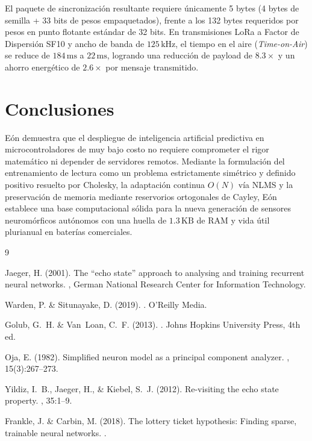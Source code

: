 \documentclass[10pt,twocolumn]{article}
\begin{document}
El paquete de sincronización resultante requiere únicamente 5 bytes (4 bytes de semilla + 33 bits de pesos empaquetados), frente a los 132 bytes requeridos por pesos en punto flotante estándar de 32 bits. En transmisiones LoRa a Factor de Dispersión SF10 y ancho de banda de $125\,\text{kHz}$, el tiempo en el aire (\textit{Time-on-Air}) se reduce de $184\,\text{ms}$ a $22\,\text{ms}$, logrando una reducción de payload de $8.3\times$ y un ahorro energético de $2.6\times$ por mensaje transmitido.

\section{Conclusiones}

Eón demuestra que el despliegue de inteligencia artificial predictiva en microcontroladores de muy bajo costo no requiere comprometer el rigor matemático ni depender de servidores remotos. Mediante la formulación del entrenamiento de lectura como un problema estrictamente simétrico y definido positivo resuelto por Cholesky, la adaptación continua $O(N)$ vía NLMS y la preservación de memoria mediante reservorios ortogonales de Cayley, Eón establece una base computacional sólida para la nueva generación de sensores neuromórficos autónomos con una huella de $1.3\,\text{KB}$ de RAM y vida útil plurianual en baterías comerciales.

\begin{thebibliography}{9}

Jaeger, H. (2001).
\newblock The ``echo state'' approach to analysing and training recurrent neural networks.
, German National Research Center for Information Technology.

Warden, P. \& Situnayake, D. (2019).
.
\newblock O'Reilly Media.

Golub, G.~H. \& Van~Loan, C.~F. (2013).
.
\newblock Johns Hopkins University Press, 4th ed.

Oja, E. (1982).
\newblock Simplified neuron model as a principal component analyzer.
, 15(3):267--273.

Yildiz, I.~B., Jaeger, H., \& Kiebel, S.~J. (2012).
\newblock Re-visiting the echo state property.
, 35:1--9.

Frankle, J. \& Carbin, M. (2018).
\newblock The lottery ticket hypothesis: Finding sparse, trainable neural networks.
.

\end{thebibliography}
\end{document}

